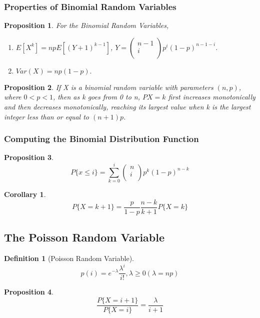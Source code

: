 \documentclass[12pt]{article}
\newtheorem{definition}{Definition}[subsection]
\newtheorem{proposition}{Proposition}[subsection]
\newtheorem{corollary}{Corollary}[subsection]
\begin{document}
        \subsubsection{Properties of Binomial Random Variables}
        \begin{proposition}
            For the Binomial Random Variables,
            \begin{enumerate}
                \item $E[X^k] = npE[(Y + 1)^{k - 1}]$, $Y = \left(\begin{array}{c} n - 1\\ i\\ \end{array}\right)p^i(1-p)^{n-1-i}.$
                \item $Var(X) = np(1-p).$
            \end{enumerate}
        \end{proposition}
        \begin{proposition}
            If X is a binomial random variable with parameters $(n, p)$, where $0 < p < 1$, then as k goes from 0 to n, $P{X = k}$ first increases monotonically and then decreases monotonically, reaching its largest value when k is the largest integer less than or equal to $(n + 1)p$.
        \end{proposition}

        \subsubsection{Computing the Binomial Distribution Function}
        \begin{proposition}
            \[P\{x \leq i\} = \sum^i_{k=0}\left(\begin{array}{c} n\\ i\\ \end{array}\right) p^k(1 - p)^{n - k}\]
        \end{proposition}
        \begin{corollary}
            \[P\{X = k + 1\} = \frac{p}{1-p} \frac{n-k}{k+1} P\{X = k\}\]
        \end{corollary}
        \subsection{The Poisson Random Variable}
        \begin{definition}[Poisson Random Variable]
            \[p(i) = e^{-\lambda}\frac{\lambda^i}{i!}, \lambda \geq 0(\lambda = np)\]
        \end{definition}
        \begin{proposition}
            \[\frac{P\{X = i + 1\}}{P\{X = i\}} = \frac{\lambda}{i+1} \]
        \end{proposition}
        
\end{document}
